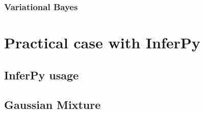 \documentclass[twoside,openright,titlepage,numbers=noenddot,openany,headinclude,footinclude=true, cleardoublepage=empty,abstractoff,BCOR=5mm,paper=a4,fontsize=11pt, dvipsnames]{scrreprt}
\begin{document}


\section{Variational Bayes}



\ctparttext{
  \color{black}
  \begin{center}

  \end{center}
}
\part{Practical case with InferPy}

\chapter{InferPy usage}



\chapter{Gaussian Mixture}

\clearpage
\nocite{*}


\end{document}
